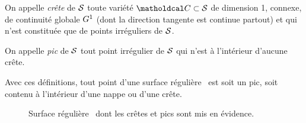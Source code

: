\begin{definition}[Crête]
	On appelle \emph{crête} de $\mathcal{S}$ toute variété $\crete \subset \interface$ de dimension 1, connexe, de continuité globale $G^{1}$ (\ie dont la direction tangente est continue partout) et qui n'est constituée que de points irréguliers de $\mathcal{S}$.
\end{definition}

\begin{definition}[pic]
	On appelle \emph{pic} de $\mathcal{S}$ tout point irrégulier de $\mathcal{S}$ qui n'est à l'intérieur d'aucune crête.
\end{definition}

Avec ces définitions, tout point d'une surface régulière \piecewise\ est soit un pic, soit contenu à l'intérieur d'une nappe ou d'une crête.


\begin{figure}
	\centering
	
	\caption{Surface régulière \piecewise\ dont les crêtes et pics sont mis en évidence.}
	\label{fig:piecewise_smooth_surface_decomposition}
\end{figure}


